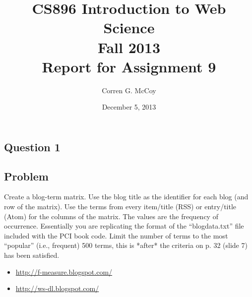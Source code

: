 \documentclass[letterpaper,11pt]{report}
\begin{document}
 
\begin{savenotes}
\pagestyle{plain}
\title{CS896 Introduction to Web Science\\Fall 2013\\Report for Assignment 9}
\author{Corren G. McCoy}
 
\date{December 5, 2013}
\maketitle

\renewcommand*\thesection{\arabic{section}}
\setcounter{section}{0}

\setcounter{tocdepth}{4}
\tableofcontents
 \listoffigures
 \listoftables
\newpage


\section{Question 1}
\subsection{Problem}Create a blog-term matrix. Use the blog title as the identifier for each blog (and row of the matrix).  Use the terms from every item/title (RSS) or entry/title (Atom) for the columns of the matrix.  The values are the frequency of occurrence.  Essentially you are replicating the format of the ``blogdata.txt'' file included with the PCI book code.  Limit the number of terms to the most ``popular'' (i.e., frequent) 500 terms, this is *after* the criteria on p. 32 (slide 7) has been satisfied.
\begin{itemize}
\item \url{http://f-measure.blogspot.com/}
\item \url{http://ws-dl.blogspot.com/}
\end{itemize}


\end{savenotes}
\end{document}
